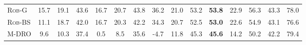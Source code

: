 \begin{table}[t]
\begin{adjustbox}{max width=\linewidth}
\begin{tabular}{l ccccccc ccc cccc}
\textsc{Rob-G} & 15.7 & 19.1 & 43.6 & 16.7 & 20.7 & 43.8 & 36.2 & 21.0 & 53.2 & \textbf{53.8} & 22.9 & 56.3 & 43.3 & 78.0 \\
\textsc{Rob-BS} & 11.1 & 18.7 & 42.0 & 16.7 & 20.3 & 42.2 & 34.3 & 20.7 & 52.5 & \textbf{53.0} & 22.6 & 54.9 & 43.1 & 76.6 \\
\textsc{M-DRO} & 9.6 & 10.3 & 37.4 & 0.5 & 8.5 & 35.6 & -4.7 & 11.8 & 45.3 & \textbf{45.6} & 14.2 & 50.2 & 42.2 & 79.4 \\
\bottomrule
\end{tabular}
\end{adjustbox}
\end{table}
